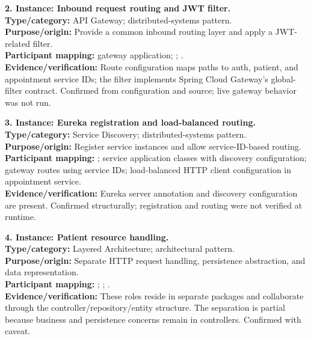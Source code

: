\documentclass[11pt,a4paper]{article}
\begin{document}
\textbf{2. Instance: Inbound request routing and JWT filter.}\\
\textbf{Type/category:} API Gateway; distributed-systems pattern.\\
\textbf{Purpose/origin:} Provide a common inbound routing layer and apply a JWT-related filter.\\
\textbf{Participant mapping:} gateway application; ; .\\
\textbf{Evidence/verification:} Route configuration maps paths to auth, patient, and appointment service IDs; the filter implements Spring Cloud Gateway's global-filter contract. Confirmed from configuration and source; live gateway behavior was not run.

\textbf{3. Instance: Eureka registration and load-balanced routing.}\\
\textbf{Type/category:} Service Discovery; distributed-systems pattern.\\
\textbf{Purpose/origin:} Register service instances and allow service-ID-based routing.\\
\textbf{Participant mapping:} ; service application classes with discovery configuration; gateway routes using  service IDs; load-balanced HTTP client configuration in appointment service.\\
\textbf{Evidence/verification:} Eureka server annotation and discovery configuration are present. Confirmed structurally; registration and routing were not verified at runtime.

\textbf{4. Instance: Patient resource handling.}\\
\textbf{Type/category:} Layered Architecture; architectural pattern.\\
\textbf{Purpose/origin:} Separate HTTP request handling, persistence abstraction, and data representation.\\
\textbf{Participant mapping:} ; ; .\\
\textbf{Evidence/verification:} These roles reside in separate packages and collaborate through the controller/repository/entity structure. The separation is partial because business and persistence concerns remain in controllers. Confirmed with caveat.
\end{document}
